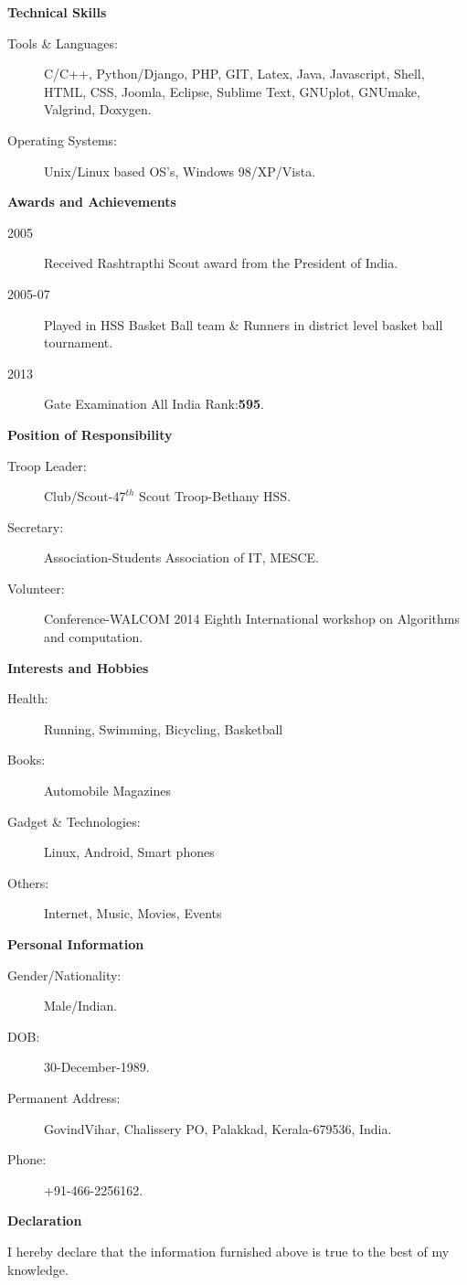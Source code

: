 \documentclass[A4paper,11pt]{article}
\newcommand{\resitem}[1]{\item #1 \vspace{-2pt}}
\newcommand{\resheading}[1]{{\large \colorbox{mygrey}{\begin{minipage}{\textwidth}{\textbf{#1 \vphantom{p\^{E}}}}\end{minipage}}}}
\begin{document}
\resheading{Technical Skills}

\begin{description}
\item[Tools \& Languages:]  C/C++, Python/Django, PHP, GIT, Latex, Java, Javascript, Shell, HTML, CSS, Joomla, Eclipse, Sublime Text, GNUplot, GNUmake, Valgrind, Doxygen.
\item[Operating Systems:] Unix/Linux based OS's, Windows 98/XP/Vista.
\end{description}

\resheading{Awards and Achievements}
	\begin{description}
		\resitem[2005] Received Rashtrapthi Scout award from the President of India.
		\resitem[2005-07]Played in HSS Basket Ball team \& Runners in district level basket ball tournament.
		\resitem[2013] Gate Examination All India Rank:\textbf{595}.
\end{description}

\resheading{Position of Responsibility}
\begin{description}
\item[Troop Leader:] Club/Scout-$47^{th}$ Scout Troop-Bethany HSS.
\item[Secretary:] Association-Students Association of IT, MESCE.
\item[Volunteer:] Conference-WALCOM 2014 Eighth International workshop on Algorithms and computation.
\end{description}

\resheading{Interests and Hobbies}
\begin{description}
\item[Health:]
Running, Swimming, Bicycling, Basketball
\item[Books:]
Automobile Magazines
\item[Gadget \& Technologies:]
Linux, Android, Smart phones
\item[Others:]
Internet, Music, Movies, Events
\end{description}

\resheading{Personal Information}
\begin{description}
\resitem[Gender/Nationality:]Male/Indian.
\resitem[DOB:]30-December-1989.
\resitem[Permanent Address:]GovindVihar, Chalissery PO, Palakkad, Kerala-679536, India.
\resitem[Phone:]+91-466-2256162.
\end{description}

\resheading{Declaration}
\begin{description}
\item{I hereby declare that the information furnished above is true to the best of my knowledge.}
\end{description}
\end{document}
